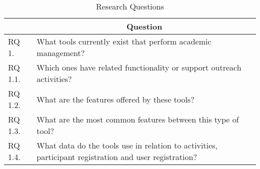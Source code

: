 \begin{table}[!htb]
  \centering
  \caption{Research Questions}
  \label{tab:research-questions}
  \footnotesize
  \begin{tabular}{l|p{12cm}}
    \bottomrule
    \rowcolor[rgb]{0.753,0.753,0.753} \multicolumn{1}{c|}{\textbf{ID}} & \multicolumn{1}{c}{\textbf{Question}}                                                                 \\
    \hline
    \rowcolor[rgb]{0.898,0.898,0.898} RQ 1.                            & What tools currently exist that perform academic management?                                          \\
    RQ 1.1.                                                            & Which ones have related functionality or support outreach activities?                                 \\
    \rowcolor[rgb]{0.898,0.898,0.898} RQ 1.2.                          & What are the features offered by these tools?                                                         \\
    RQ 1.3.                                                            & What are the most common features between this type of tool?                                          \\
    \rowcolor[rgb]{0.898,0.898,0.898} RQ 1.4.                          & What data do the tools use in relation to activities, participant registration and user registration? \\
    \toprule
  \end{tabular}
\end{table}